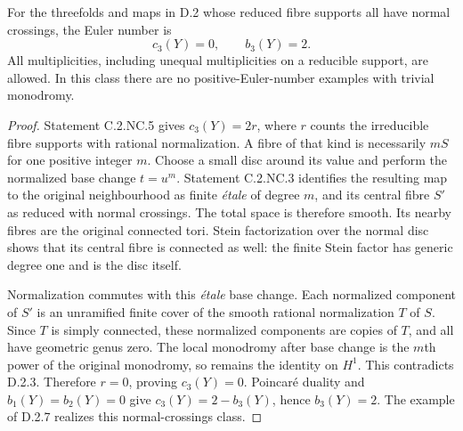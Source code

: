 \begin{theorem}
\label{st:D.2.4}
For the threefolds and maps in D.2 whose reduced fibre supports
all have normal crossings, the Euler number is
\[
c_3(Y)=0,\qquad b_3(Y)=2.
\]
All multiplicities, including unequal multiplicities on a
reducible support, are allowed. In this class there are no
positive-Euler-number examples with trivial monodromy.
\end{theorem}
\begin{proof}
Statement C.2.NC.5 gives $c_3(Y)=2r$, where $r$ counts the
irreducible fibre supports with rational normalization. A fibre
of that kind is necessarily $mS$ for one positive integer $m$.
Choose a small disc around its value and perform the normalized
base change $t=u^m$. Statement C.2.NC.3 identifies the resulting
map to the original neighbourhood as finite \emph{\'etale} of
degree $m$, and its central fibre $S'$ as reduced with normal
crossings. The total space is therefore smooth. Its nearby
fibres are the original connected tori. Stein factorization
over the normal disc shows that its central fibre is connected
as well: the finite Stein factor has generic degree one and is
the disc itself.

Normalization commutes with this \emph{\'etale} base change.
Each normalized component of $S'$ is an unramified finite cover
of the smooth rational normalization $T$ of $S$. Since $T$ is
simply connected, these normalized components are copies of
$T$, and all have geometric genus zero. The local monodromy
after base change is the $m$th power of the original monodromy,
so remains the identity on $H^1$. This contradicts D.2.3.
Therefore $r=0$, proving $c_3(Y)=0$. Poincar\'e duality and
$b_1(Y)=b_2(Y)=0$ give $c_3(Y)=2-b_3(Y)$, hence $b_3(Y)=2$.
The example of D.2.7 realizes this normal-crossings class.
\end{proof}
